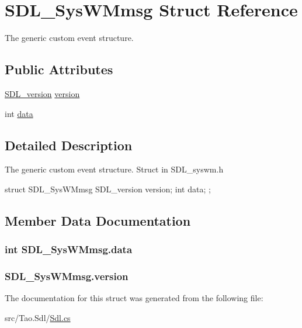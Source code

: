 \hypertarget{struct_s_d_l___sys_w_mmsg}{
\section{SDL\_\-SysWMmsg Struct Reference}
\label{struct_s_d_l___sys_w_mmsg}
}


The generic custom event structure.  


\subsection*{Public Attributes}
\begin{DoxyCompactItemize}
\item 
\hyperlink{struct_s_d_l__version}{SDL\_\-version} \hyperlink{struct_s_d_l___sys_w_mmsg_a6c0de5f7da6587cfe807c213fef50f1d}{version}
\item 
int \hyperlink{struct_s_d_l___sys_w_mmsg_a8a235ec4d5e8c5eda13fb4bb094868f3}{data}
\end{DoxyCompactItemize}


\subsection{Detailed Description}
The generic custom event structure. Struct in SDL\_\-syswm.h 
\begin{DoxyCode}
            struct SDL_SysWMmsg {
                SDL_version version;
                int data;
            };          
\end{DoxyCode}
  

\subsection{Member Data Documentation}
\hypertarget{struct_s_d_l___sys_w_mmsg_a8a235ec4d5e8c5eda13fb4bb094868f3}{
\subsubsection[{data}]{\setlength{\rightskip}{0pt plus 5cm}int {\bf SDL\_\-SysWMmsg.data}}}
\label{struct_s_d_l___sys_w_mmsg_a8a235ec4d5e8c5eda13fb4bb094868f3}
\hypertarget{struct_s_d_l___sys_w_mmsg_a6c0de5f7da6587cfe807c213fef50f1d}{
\subsubsection[{version}]{ {\bf SDL\_\-SysWMmsg.version}}}
\label{struct_s_d_l___sys_w_mmsg_a6c0de5f7da6587cfe807c213fef50f1d}


The documentation for this struct was generated from the following file:\begin{DoxyCompactItemize}
\item 
src/Tao.Sdl/\hyperlink{_sdl_8cs}{Sdl.cs}\end{DoxyCompactItemize}
